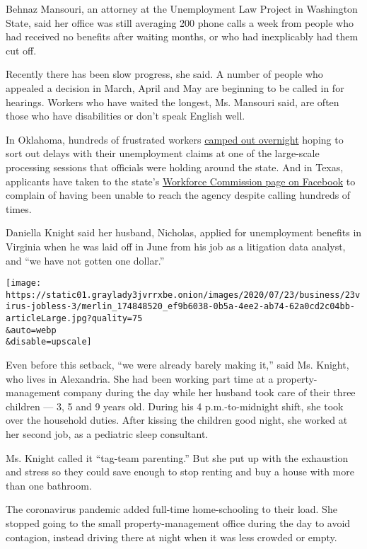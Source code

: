 Behnaz Mansouri, an attorney at the Unemployment Law Project in
Washington State, said her office was still averaging 200 phone calls a
week from people who had received no benefits after waiting months, or
who had inexplicably had them cut off.

Recently there has been slow progress, she said. A number of people who
appealed a decision in March, April and May are beginning to be called
in for hearings. Workers who have waited the longest, Ms. Mansouri said,
are often those who have disabilities or don't speak English well.

In Oklahoma, hundreds of frustrated workers
\href{https://www.washingtonpost.com/national/a-very-dark-feeling-hundreds-camp-out-in-oklahoma-unemployment-lines/2020/07/20/44d59cb6-c77a-11ea-a99f-3bbdffb1af38_story.html}{camped
out overnight} hoping to sort out delays with their unemployment claims
at one of the large-scale processing sessions that officials were
holding around the state. And in Texas, applicants have taken to the
state's
\href{https://www.facebookcorewwwi.onion/texasworkforcecommission/}{Workforce
Commission page on Facebook} to complain of having been unable to reach
the agency despite calling hundreds of times.

Daniella Knight said her husband, Nicholas, applied for unemployment
benefits in Virginia when he was laid off in June from his job as a
litigation data analyst, and ``we have not gotten one dollar.''

\texttt{[image: https://static01.graylady3jvrrxbe.onion/images/2020/07/23/business/23virus-jobless-3/merlin\_174848520\_ef9b6038-0b5a-4ee2-ab74-62a0cd2c04bb-articleLarge.jpg?quality=75\\\&auto=webp\\\&disable=upscale]}

Even before this setback, ``we were already barely making it,'' said Ms.
Knight, who lives in Alexandria. She had been working part time at a
property-management company during the day while her husband took care
of their three children --- 3, 5 and 9 years old. During his 4
p.m.-to-midnight shift, she took over the household duties. After
kissing the children good night, she worked at her second job, as a
pediatric sleep consultant.

Ms. Knight called it ``tag-team parenting.'' But she put up with the
exhaustion and stress so they could save enough to stop renting and buy
a house with more than one bathroom.

The coronavirus pandemic added full-time home-schooling to their load.
She stopped going to the small property-management office during the day
to avoid contagion, instead driving there at night when it was less
crowded or empty.

